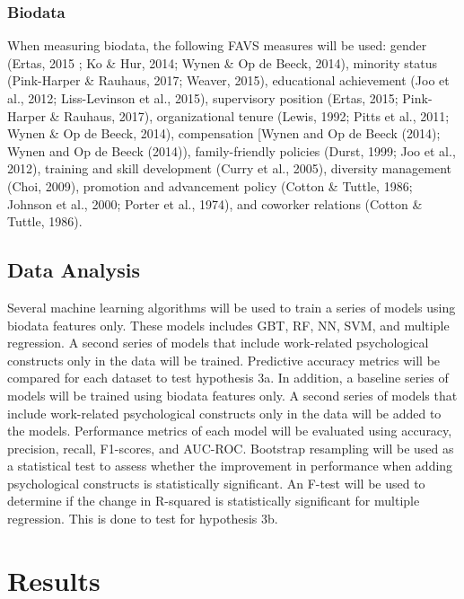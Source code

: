\documentclass[
  jou]{apa6}
\begin{document}
\hypertarget{biodata}{%
\subsubsection{Biodata}\label{biodata}}

When measuring biodata, the following FAVS measures will be used: gender (Ertas, 2015 ; Ko \& Hur, 2014; Wynen \& Op de Beeck, 2014), minority status (Pink-Harper \& Rauhaus, 2017; Weaver, 2015), educational achievement (Joo et al., 2012; Liss-Levinson et al., 2015), supervisory position (Ertas, 2015; Pink-Harper \& Rauhaus, 2017), organizational tenure (Lewis, 1992; Pitts et al., 2011; Wynen \& Op de Beeck, 2014),
compensation {[}Wynen and Op de Beeck (2014); Wynen and Op de Beeck (2014)), family-friendly policies (Durst, 1999; Joo et al., 2012), training and skill development (Curry et al., 2005), diversity management (Choi, 2009), promotion and advancement policy (Cotton \& Tuttle, 1986; Johnson et al., 2000; Porter et al., 1974), and coworker relations (Cotton \& Tuttle, 1986).

\hypertarget{data-analysis-1}{%
\subsection{Data Analysis}\label{data-analysis-1}}

Several machine learning algorithms will be used to train a series of models using biodata features only. These models includes GBT, RF, NN, SVM, and multiple regression. A second series of models that include work-related psychological constructs only in the data will be trained. Predictive accuracy metrics will be compared for each dataset to test hypothesis 3a.
In addition, a baseline series of models will be trained using biodata features only. A second series of models that include work-related psychological constructs only in the data will be added to the models. Performance metrics of each model will be evaluated using accuracy, precision, recall, F1-scores, and AUC-ROC. Bootstrap resampling will be used as a statistical test to assess whether the improvement in performance when adding psychological constructs is statistically significant. An F-test will be used to determine if the change in R-squared is statistically significant for multiple regression. This is done to test for hypothesis 3b.

\hypertarget{results}{%
\section{Results}\label{results}}
\end{document}
